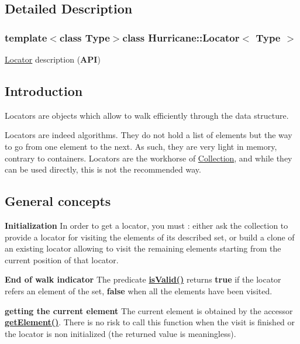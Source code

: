 \subsection{Detailed Description}
\subsubsection*{template$<$class Type$>$class Hurricane\-::\-Locator$<$ Type $>$}

\hyperlink{classHurricane_1_1Locator}{Locator} description ({\bfseries A\-P\-I}) 

\hypertarget{classHurricane_1_1Locator_secLocatorIntro}{}\subsection{Introduction}\label{classHurricane_1_1Locator_secLocatorIntro}
Locators are objects which allow to walk efficiently through the data structure.

Locators are indeed algorithms. They do not hold a list of elements but the way to go from one element to the next. As such, they are very light in memory, contrary to containers. Locators are the workhorse of \hyperlink{classHurricane_1_1Collection}{Collection}, and while they can be used directly, this is not the recommended way.\hypertarget{classHurricane_1_1Locator_secLocatorGeneralConcepts}{}\subsection{General concepts}\label{classHurricane_1_1Locator_secLocatorGeneralConcepts}
{\bfseries Initialization} In order to get a locator, you must \-: either ask the collection to provide a locator for visiting the elements of its described set, or build a clone of an existing locator allowing to visit the remaining elements starting from the current position of that locator.

{\bfseries End of walk indicator} The predicate {\bfseries \hyperlink{classHurricane_1_1Locator_abb6e5255372e22e31bf0a8e4cae93f87}{is\-Valid()}} returns {\bfseries true} if the locator refers an element of the set, {\bfseries false} when all the elements have been visited.

{\bfseries getting the current element} The current element is obtained by the accessor {\bfseries \hyperlink{classHurricane_1_1Locator_aa2202b4cf461a7c3b666da10bc96219f}{get\-Element()}}. There is no risk to call this function when the visit is finished or the locator is non initialized (the returned value is meaningless).

